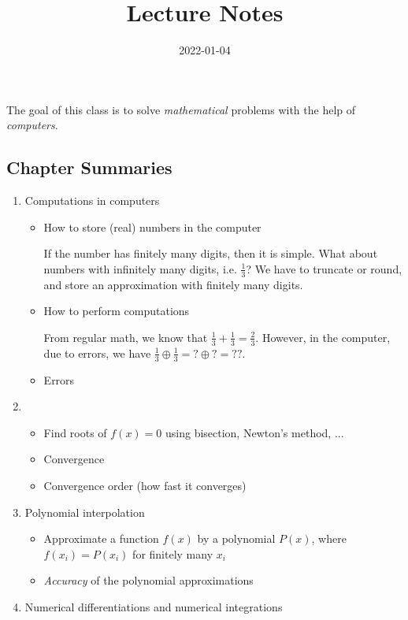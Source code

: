 \documentclass{article}
\date{2022-01-04}
\title{Lecture Notes}
\begin{document}
  \maketitle
  \newpage
  
  The goal of this class is to solve \emph{mathematical} problems with the help of \emph{computers}.
  \subsection{Chapter Summaries}
  \begin{enumerate}
    \item Computations in computers
    \begin{itemize}
      \item How to store (real) numbers in the computer
      \begin{note}{}
        If the number has finitely many digits, then it is simple. What about numbers with infinitely many digits, i.e. $\frac{1}{3}$? We have to truncate or round, and store an approximation with finitely many digits.
      \end{note}
      \item How to perform computations
      \begin{note}{}
        From regular math, we know that $\frac{1}{3} + \frac{1}{3} = \frac{2}{3}$. However, in the computer, due to errors, we have $\frac{1}{3}\oplus \frac{1}{3} = ? \oplus ? = ??$.
      \end{note}
      \item Errors
    \end{itemize}
    \item 
    \begin{itemize}
      \item Find roots of $f(x) = 0$ using bisection, Newton's method, ...
      \item Convergence
      \item Convergence order (how fast it converges)
    \end{itemize}
    \item Polynomial interpolation
    \begin{itemize}
      \item Approximate a function $f(x)$ by a polynomial $P(x)$, where $f(x_i) = P(x_i)$ for finitely many $x_i$
      \item \emph{Accuracy} of the polynomial approximations
    \end{itemize}
    \item Numerical differentiations and numerical integrations

\end{enumerate}
\end{document}
